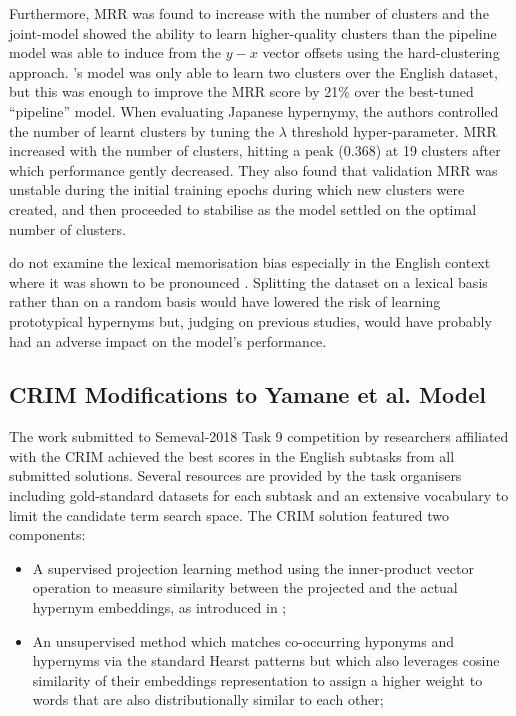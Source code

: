Furthermore, \ac{MRR} was found to increase with the number of clusters and the joint-model showed the ability to learn higher-quality clusters than the pipeline model was able to induce from the $y-x$ vector offsets using the hard-clustering approach.  \citeauthor{yamane2016distributional}'s model was only able to learn two clusters over the English dataset, but this was enough to improve the \ac{MRR} score by 21\% over the best-tuned “pipeline” model.  When evaluating Japanese hypernymy, the authors controlled the number of learnt clusters by tuning the $\lambda$ threshold hyper-parameter.  \ac{MRR} increased with the number of clusters, hitting a peak (0.368) at 19 clusters after which performance gently decreased.  They also found that validation \ac{MRR} was unstable during the initial training epochs during which new clusters were created, and then proceeded to stabilise as the model settled on the optimal number of clusters.

\citeauthor{yamane2016distributional} do not examine the lexical memorisation bias especially in the English context where it was shown to be pronounced \citep{levy2015supervised, shwartz2017siege}.  Splitting the dataset on a lexical basis rather than on a random basis would have lowered the risk of learning prototypical hypernyms but, judging on previous studies, would have probably had an adverse impact on the model’s performance.

\subsection{CRIM Modifications to Yamane et al. Model} \label{CRIM}
The work submitted to Semeval-2018 Task 9 competition \citep{camacho2018semeval} by researchers affiliated with the \ac{CRIM} achieved the best scores in the English subtasks from all submitted solutions.  Several resources are provided by the task organisers including gold-standard datasets for each subtask and an extensive vocabulary to limit the candidate term search space.  The CRIM solution featured two components:
\begin{itemize}
    \item A supervised projection learning method using the inner-product vector operation to measure similarity between the projected and the actual hypernym embeddings, as introduced in \citep{yamane2016distributional};
    \item An unsupervised method which matches co-occurring hyponyms and hypernyms via the standard Hearst patterns \citep{hearst1992automatic} but which also leverages cosine similarity of their embeddings representation to assign a higher weight to words that are also distributionally similar to each other;
\end{itemize}

